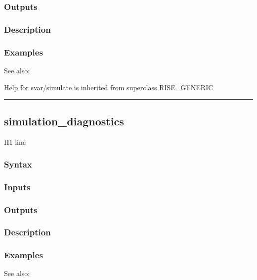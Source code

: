 \documentclass[letterpaper,10pt,english]{sphinxmanual}
\begin{document}
\subsubsection{Outputs}
\label{classes/models/@svar/svar:id118}

\subsubsection{Description}
\label{classes/models/@svar/svar:id119}

\subsubsection{Examples}
\label{classes/models/@svar/svar:id120}
See also:

Help for svar/simulate is inherited from superclass RISE\_GENERIC


\bigskip\hrule{}\bigskip



\subsection{simulation\_diagnostics}
\label{classes/models/@svar/svar:simulation-diagnostics}\label{classes/models/@svar/svar:id121}
H1 line


\subsubsection{Syntax}
\label{classes/models/@svar/svar:id122}

\subsubsection{Inputs}
\label{classes/models/@svar/svar:id123}

\subsubsection{Outputs}
\label{classes/models/@svar/svar:id124}

\subsubsection{Description}
\label{classes/models/@svar/svar:id125}

\subsubsection{Examples}
\label{classes/models/@svar/svar:id126}
See also:
\end{document}
